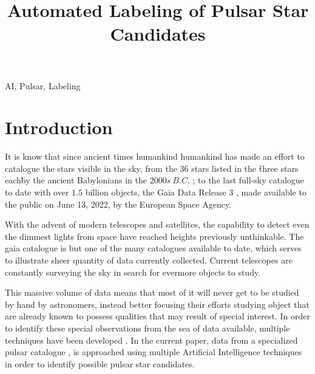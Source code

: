 \documentclass[conference]{IEEEtran}
\begin{document}
\title{Automated Labeling of Pulsar Star Candidates}

\author{
    }

\maketitle

\begin{abstract}
    \todo{}
\end{abstract}

\begin{IEEEkeywords}
    AI, Pulsar, Labeling
\end{IEEEkeywords}

\section{Introduction\label{sec:intro}}
It is know that since ancient times humankind humankind has made an effort to
catalogue the stars visible in the sky, from the $36$ stars listed in the
\"three stars each\" by the ancient Babylonians in the $2000s\ B.C.$
\cite{astronomy:history:north}; to the last full-sky catalogue to date with over
$1.5$ billion objects, the Gaia Data Release 3 \cite{gaia:dr3:esa}, made available
to the public on June 13, 2022, by the European Space Agency.

With the advent of modern telescopes and satellites, the capability to detect
even the dimmest lights from space have reached heights previously unthinkable.
The gaia catalogue is but one of the many catalogues available to date, which
serves to illustrate sheer quantity of data currently collected. Current
telescopes are constantly surveying the sky in search for evermore objects to study.

This massive volume of data means that most of it will never get to be studied
by hand by astronomers, instead better focusing their efforts studying object
that are already known to possess qualities that may result of special interest.
In order to identify these special observations from the sea of data available,
multiple techniques have been developed \cite{pulsar:dataset:explanation:lyon}.
In the current paper, data from a specialized pulsar catalogue
\cite{pulsar:dataset:lyon}, is approached using multiple Artificial Intelligence
techniques in order to identify possible pulsar star candidates.
\end{document}

